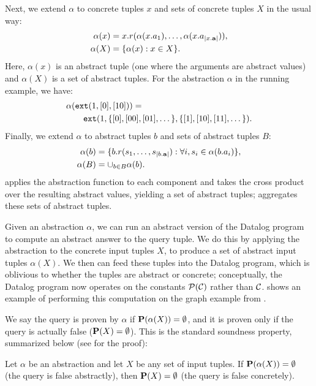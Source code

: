 Next, we extend $\alpha$ to concrete tuples $x$ and sets of concrete tuples $X$
in the usual way:
\begin{align}
\alpha(x) &= x.r(\alpha(x.a_1), \dots, \alpha(x.a_{|x.\mathbf{a}|})), \\
\alpha(X) &= \{ \alpha(x) : x \in X \}.
\end{align}
Here, $\alpha(x)$ is an abstract tuple (one where the arguments are abstract values)
and $\alpha(X)$ is a set of abstract tuples.
For the abstraction $\alpha$ in the running example, we have:
\begin{align}
& \alpha(\text{\tt ext}(1, [0], [10])) = \\
& \quad\quad \text{\tt ext}(1, \{[0], [00], [01], \dots\}, \{[1], [10], [11], \dots\}). \nonumber
\end{align}
Finally, we extend $\alpha$ to abstract tuples $b$ and sets of abstract tuples $B$:
\begin{align}
\alpha(b) &= \{ b.r(s_1, \dots, s_{|b.\mathbf{a}|}) : \forall i, s_i \in \alpha(b.a_i) \}, \label{eqn:alphab} \\
\alpha(B) &= \cup_{b \in B} \alpha(b). \label{eqn:alphaB}
\end{align}
 applies the abstraction function to each component and takes the cross product over the resulting abstract values,
yielding a set of abstract tuples;
 aggregates these sets of abstract tuples.

Given an abstraction $\alpha$,
we can run an abstract version of the Datalog program to compute an abstract answer to the query tuple.
We do this by applying the abstraction to the concrete input tuples $X$,
to produce a set of abstract input tuples $\alpha(X)$.
We then can feed these tuples into the Datalog program,
which is oblivious to whether the tuples are abstract or concrete;
conceptually, the Datalog program now operates on the constants $\mathcal{P}(\mathcal{C})$ rather than $\mathcal{C}$.
 shows an example of performing this computation on the
graph example from .

We say the query is proven by $\alpha$ if $\mathbf{P}(\alpha(X)) = \emptyset$,
and it is proven only if the query is actually false ($\mathbf{P}(X) = \emptyset$).
This is the standard soundness property, summarized below (see  for the proof):
\begin{proposition}
\label{prop:soundness}
Let $\alpha$ be an abstraction and let $X$ be any set of input tuples.
If $\mathbf{P}(\alpha(X)) = \emptyset$ (the query is false abstractly),
then $\mathbf{P}(X) = \emptyset$ (the query is false concretely).
\end{proposition}

